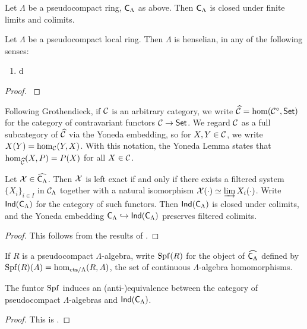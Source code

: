 \documentclass[phd,cornellheadings,draft]{cornell}
\begin{document}
\begin{lemma}
Let $\Lambda$ be a pseudocompact ring, $\mathsf{C}_\Lambda$ as above. Then 
$\mathsf{C}_\Lambda$ is closed under finite limits and colimits. 
\end{lemma}

\begin{lemma}
Let $\Lambda$ be a pseudocompact local ring. Then $\Lambda$ is henselian, in 
any of the following senses:
\begin{enumerate}
\item
d
\end{enumerate}
\end{lemma}
\begin{proof}
\cite[18.5.?]{ega4-4}
\end{proof}

Following Grothendieck, if $\mathcal{C}$ is an arbitrary category, we write 
$\widehat{\mathcal{C}}=\hom(\mathcal{C}^\circ,\mathsf{Set})$ for the category of contravariant functors 
$\mathcal{C}\to \mathsf{Set}$. We regard $\mathcal{C}$ as a full subcategory of $\widehat{\mathcal{C}}$ via the 
Yoneda embedding, so for $X,Y\in \mathcal{C}$, we write $X(Y) = \hom_{\mathcal{C}}(Y,X)$. With 
this notation, the Yoneda Lemma states that $\hom_{\widehat{\mathcal{C}}}(X,P) = P(X)$ 
for all $X\in \mathcal{C}$. 

\begin{lemma}\label{thm:ind-object-def}
Let $\mathcal{X}\in\widehat{\mathsf{C}_\Lambda}$. Then $\mathcal{X}$ is left exact if and only 
if there exists a filtered system $\{X_i\}_{i\in I}$ in $\mathcal{C}_\Lambda$ together 
with a natural isomorphism $\mathcal{X}(\cdot)\simeq \varinjlim X_i(\cdot)$. Write 
$\operatorname{\mathsf{Ind}}(\mathsf{C}_\Lambda)$ for the category of such functors. Then 
$\operatorname{\mathsf{Ind}}(\mathsf{C}_\Lambda)$ is closed under colimits, and the 
Yoneda embedding $\mathsf{C}_\Lambda\hookrightarrow\operatorname{\mathsf{Ind}}(\mathsf{C}_\Lambda)$ 
preserves filtered colimits.
\end{lemma}
\begin{proof}
This follows from the results of \cite[6.1]{kashiwara-schapira-2006}. 
\end{proof}

If $R$ is a pseudocompact $\Lambda$-algebra, write $\operatorname{Spf}(R)$ for the object of 
$\widehat{\mathsf{C}_\Lambda}$ defined by $\operatorname{Spf}(R)(A)=\hom_{\mathrm{cts}/\Lambda}(R,A)$, 
the set of continuous $\Lambda$-algebra homomorphisms. 

\begin{lemma}
The funtor $\operatorname{Spf}$ induces an (anti-)equivalence between the category of 
pseudocompact $\Lambda$-algebras and $\operatorname{\mathsf{Ind}}(\mathsf{C}_\Lambda)$. 
\end{lemma}
\begin{proof}
This is \cite[VII\textsubscript{B} 0.4.2 Prop.]{sga3-1}. 
\end{proof}
\end{document}
